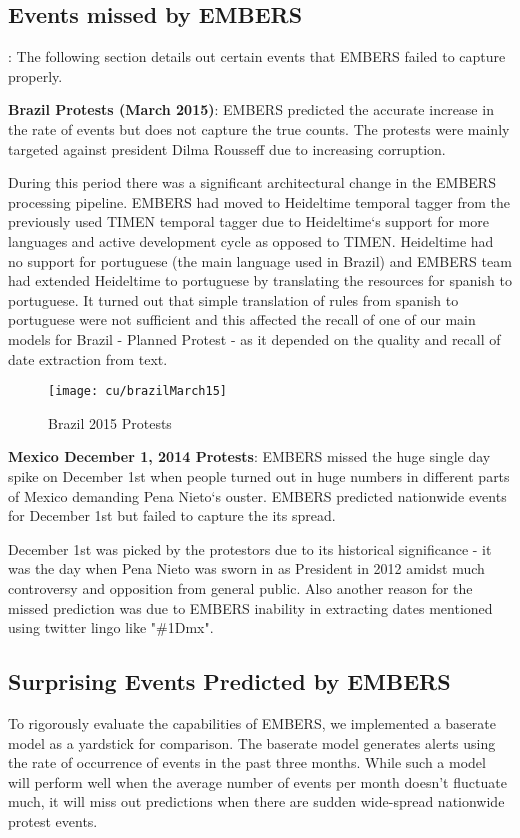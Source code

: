\subsection{Events missed by EMBERS}:
The following section details out certain events that EMBERS failed to
capture properly.

\textbf{Brazil Protests (March 2015)}: EMBERS predicted the accurate
increase in the rate of events but does not capture the true counts. The
protests were mainly targeted against president Dilma Rousseff due to
increasing corruption. 

During this period there was a significant architectural change in the
EMBERS processing pipeline. EMBERS had moved to Heideltime temporal
tagger from the previously used TIMEN temporal tagger due to
Heideltime`s support for more languages and active development cycle as
opposed to TIMEN. Heideltime had no support for portuguese (the main
language used in Brazil) and EMBERS team had extended Heideltime to
portuguese by translating the resources for spanish to portuguese. It
turned out that simple translation of rules from spanish to portuguese
were not sufficient and this affected the recall of one of our main
models for Brazil - Planned Protest - as it depended on the quality and recall of
date extraction from text.

\begin{figure}[H]
\centering
\texttt{[image: cu/brazilMarch15]}
\caption{Brazil 2015 Protests}
\label{fig:brazilSpring}
\end{figure}


\textbf{Mexico December 1, 2014 Protests}:
EMBERS missed the huge single day spike on December 1st when
people turned out in huge numbers in different parts of Mexico demanding
Pena Nieto`s ouster.
EMBERS predicted nationwide events for December 1st but failed to
capture the its spread. 

December 1st was picked by the protestors due to
its historical significance - it was the day when Pena Nieto was sworn
in as President in 2012 amidst much controversy and opposition from
general public. Also another reason for the missed prediction was due to 
EMBERS inability in extracting dates mentioned using twitter lingo  like "\#1Dmx".

\subsection{Surprising Events Predicted by EMBERS}To rigorously evaluate the capabilities of EMBERS, we implemented a baserate model as a yardstick for comparison. The baserate model generates alerts using the rate of occurrence of events in the past three months. While such a model will perform well when the average number of events per month doesn't fluctuate much, it will miss out predictions when there are sudden wide-spread nationwide protest events. 

